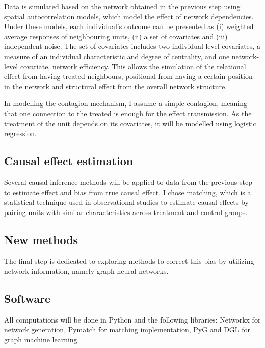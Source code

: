 \documentclass[a4paper,11pt]{article}
\begin{document}
Data is simulated based on the network obtained in the previous step using spatial autocorrelation models, which model the effect of network dependencies. Under these models, each individual’s outcome can be presented as (i) weighted average responses of neighbouring units, (ii) a set of covariates and (iii) independent noise. The set of covariates includes two individual-level covariates, a measure of an individual characteristic and degree of centrality, and one network-level covariate, network efficiency. This allows the simulation of the relational effect from having treated neighbours, positional from having a certain position in the network and structural effect from the overall network structure.

In modelling the contagion mechanism, I assume a simple contagion, meaning that one connection to the treated is enough for the effect transmission. As the treatment of the unit depends on its covariates, it will be modelled using logistic regression.

\subsection*{Causal effect estimation}
Several causal inference methods will be applied to data from the previous step to estimate effect and bias from true causal effect. I chose matching, which is a statistical technique used in observational studies to estimate causal effects by pairing units with similar characteristics across treatment and control groups. 

\subsection*{New methods}
The final step is dedicated to exploring methods to correct this bias by utilizing network information, namely graph neural networks.

\subsection*{Software}
All computations will be done in Python and the following libraries: Networkx for network generation, Pymatch for matching implementation, PyG and DGL for graph machine learning. 


\end{document}
